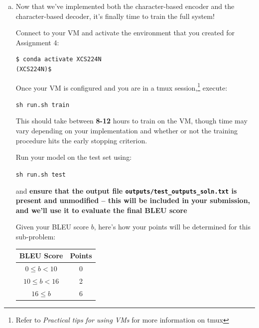 \begin{enumerate}[(a)]
    Running these should take around 10 minutes (but this depends on your local machine). 
    You should observe the average loss go down to near 0 and average perplexity on train and dev set go to 1 during training. Once you run the test, you should observe BLEU score on the test set higher than 99.00. 
    If you don't observe these things, you probably need to go back to debug!
    
    \item {} \label{qn:final_train} Now that we've implemented both the character-based encoder and the character-based decoder, it's finally time to train the full system!

    Connect to your VM and activate the environment that you created for Assignment 4:
\begin{lstlisting}
$ conda activate XCS224N
(XCS224N)$
\end{lstlisting}

    Once your VM is configured and you are in a tmux session,\footnote{Refer to \textit{Practical tips for using VMs} for more information on tmux} execute:
        \begin{center}
            \texttt{sh run.sh train}
        \end{center}
    This should take between \textbf{8-12} hours to train on the VM, though time may vary depending on your implementation and whether or not the training procedure hits the early stopping criterion. 
    
    Run your model on the test set using:
        \begin{center}
            \texttt{sh run.sh test}
        \end{center}
    and \textbf{ensure that the output file \texttt{outputs/test\_outputs\_soln.txt} is present and unmodified -- this will be included in your submission, and we'll use it to evaluate the final BLEU score}
    
    Given your BLEU score $b$, here's how your points will be determined for this sub-problem: \newline \\
    \begin{tabular}{c c}
        BLEU Score & Points \\ \hline 
        $0 \le b < 10 $ & 0 \\ %
        $10 \le b < 16$ & 2 \\ %
        $16 \le b$ & 6 \\ %
    \end{tabular}

\end{enumerate}
\clearpage

